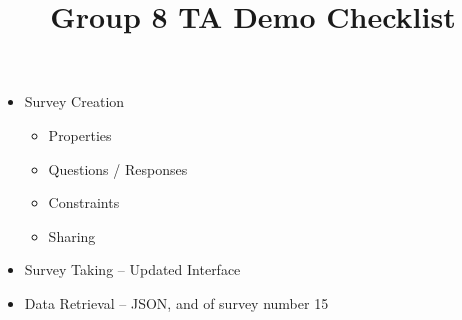 \documentclass{article}
\title{Group 8 TA Demo Checklist}
\begin{document}
\maketitle

\begin{itemize}
\item Survey Creation
  \begin{itemize}
  \item Properties
  \item Questions / Responses
  \item Constraints
  \item Sharing
  \end{itemize}
\item Survey Taking -- Updated Interface
\item Data Retrieval -- JSON, and of survey number 15
\end{itemize}
\end{document}
